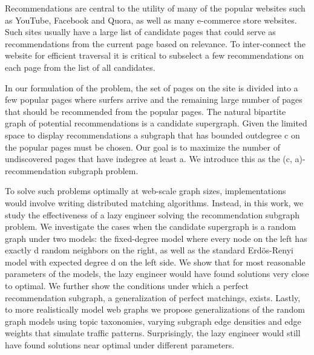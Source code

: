 \abstract

Recommendations are central to the utility of many of the popular
websites such as YouTube, Facebook and Quora, as well as many
e-commerce store websites. Such sites usually have a large list of
candidate pages that could serve as recommendations from the current
page based on relevance. To inter-connect the website for efficient
traversal it is critical to subselect a few recommendations on each
page from the list of all candidates.

In our formulation of the problem, the set of pages on the site is
divided into a few popular pages where surfers arrive and the
remaining large number of pages that should be recommended from the
popular pages. The natural bipartite graph of potential
recommendations is a candidate supergraph. Given the limited space to
display recommendations a subgraph that has bounded outdegree c on the
popular pages must be chosen. Our goal is to maximize the number of
undiscovered pages that have indegree at least a. We introduce this as
the (c, a)-recommendation subgraph problem.

To solve such problems optimally at web-scale graph sizes,
implementations would involve writing distributed matching algorithms.
Instead, in this work, we study the effectiveness of a lazy engineer
solving the recommendation subgraph problem. We investigate the cases
when the candidate supergraph is a random graph under two models: the
fixed-degree model where every node on the left has exactly d random
neighbors on the right, as well as the standard Erd\"{o}s-Renyi model
with expected degree d on the left side. We show that for most
reasonable parameters of the models, the lazy engineer would have
found solutions very close to optimal. We further show the conditions
under which a perfect recommendation subgraph, a generalization of
perfect matchings, exists. Lastly, to more realistically model web
graphs we propose generalizations of the random graph models using
topic taxonomies, varying subgraph edge densities and edge weights
that simulate traffic patterns. Surprisingly, the lazy engineer would
still have found solutions near optimal under different parameters.